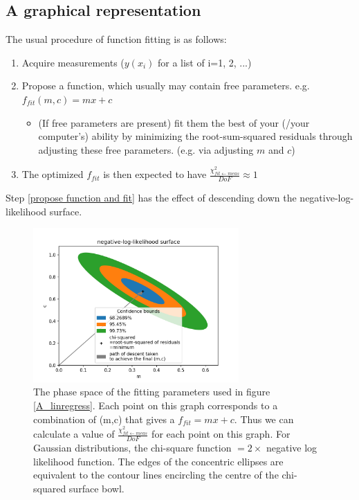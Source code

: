 \documentclass[a4paper, 12pt]{article}
\newcommand{\chifit}{\frac{\chi^2_{fit\leftarrow meas}}{DoF} }
\begin{document}
\subsection{A graphical representation}\label{Graphical proof}
The usual procedure of function fitting is as follows:
\begin{enumerate}
    \item Acquire measurements ($y(x_i)$ for a list of i=1, 2, ...)
    \item Propose a function, which usually may contain free parameters. e.g. $f_{fit}(m,c) =mx+c$ \label{propose function and fit}
    \begin{itemize}
        \item (If free parameters are present) fit them the best of your (/your computer's) ability by minimizing the root-sum-squared residuals through adjusting these free parameters. (e.g. via adjusting $m$ and $c$)
    \end{itemize}
    \item The optimized $f_{fit}$ is then expected to have $\chifit\approx 1$ \label{goodness of fit test point}
\end{enumerate}

Step \ref{propose function and fit} has the effect of descending down the negative-log-likelihood surface.

\begin{figure}[H]
\centering
\includegraphics[width=0.7\textwidth]{Phase_space.png}
\caption{The phase space of the fitting parameters used in figure \ref{A_linregress}. Each point on this graph corresponds to a combination of (m,c) that gives a $f_{fit}=mx+c$. Thus we can calculate a value of $\chifit$ for each point on this graph.
For Gaussian distributions, the chi-square function $=2\times$ negative log likelihood function. The edges of the concentric ellipses are equivalent to the contour lines encircling the centre of the chi-squared surface bowl.
}\label{Phase_space}
\end{figure}
\end{document}
